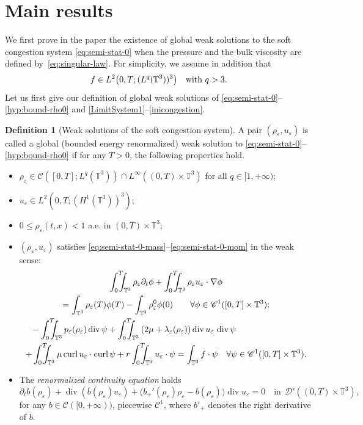 \documentclass[10pt]{amsart}
\let\mathcal\mathscr
\let\cal\mathcal
\newcommand{\<}{\bigl\langle}
\renewcommand{\>}{\bigr\rangle}
\newcommand{\intTTT}{\int_0^T\hspace*{-2.5mm}\int_{\TT}}
\newcommand{\labeleq}[1]{}
\theoremstyle{definition}
\newtheorem{definition}[thm]{Definition}
\theoremstyle{remark}
\newcommand{\TT}{\mathbb{T}^3}
\DeclareMathOperator{\curl}{curl}
\DeclareMathOperator{\Div}{div}
\let\ep\varepsilon
\begin{document}
\section{Main results}
We first prove in the paper the existence of global weak solutions to the soft congestion system \eqref{eq:semi-stat-0} when the pressure and the bulk viscosity are defined by~\eqref{eq:singular-law}. For simplicity, we assume in addition that
\begin{equation}\label{hyp:f}
f \in L^2\big(0,T; (L^q(\TT))^3\big) \quad\hbox{with } q>3.
\end{equation}
Let us first give our definition of global weak solutions of \eqref{eq:semi-stat-0}--\eqref{hyp:bound-rho0} and \eqref{LimitSystem1}--\eqref{inicongestion}.
\begin{definition}[Weak solutions of the soft congestion system]
A pair $(\rho_\ep,u_\ep)$ is called a global (bounded energy renormalized) weak solution to \eqref{eq:semi-stat-0}--\eqref{hyp:bound-rho0} if for any $T > 0$, the following properties hold.
\begin{itemize}
\item $\rho_\ep \in \mathcal{C}([0,T];L^q(\TT)) \cap L^\infty((0,T) \times \TT)$ for all $q \in [1, +\infty)$;
\item
$u_\ep\in L^2(0,T;(H^1(\TT))^3)$;
\item $0 \leq \rho_\ep(t,x) < 1$ a.e. in $(0,T)\times \TT$;
\item $(\rho_\ep,u_\ep)$ satisfies \eqref{eq:semi-stat-0-mass}--\eqref{eq:semi-stat-0-mom}
in the weak sense:
\begin{multline*}\labeleq{weak-ep-mass}
\intTTT{\rho_{\ep} \partial_t \phi}
+ \intTTT{\rho_{\ep} u_{\ep} \cdot \nabla \phi} \\
= \int_{\TT}{\rho_\ep(T) \phi(T)} - \int_{\TT}{\rho_\ep^0 \phi(0)}
\qquad \forall \phi \in \mathcal{C}^1([0,T] \times \TT);
\\
\labeleq{weak-ep-div-mom}
\shoveleft{- \intTTT{p_{\ep}(\rho_{\ep})\Div \psi}
+ \intTTT{(2\mu+\lambda_{\ep}(\rho_{\ep}))
\Div u_{\ep} \, \Div \psi}} \\
+ \intTTT
\mu\curl u_{\ep} \cdot \curl \psi
+ r\intTTT{u_{\ep} \cdot \psi}
= \int_{\TT}{f \cdot \psi}
\quad \forall \psi \in \mathcal{C}^1([0,T] \times \TT).
\end{multline*} 
\item The \emph{renormalized continuity equation} holds
\begin{equation*}\labeleq{renormalized-ep}
\partial_t b(\rho_{\ep}) + \Div(b(\rho_{\ep}) u_{\ep})
+ \big(b_+'(\rho_{\ep})\rho_{\ep}
- b(\rho_{\ep})\big)\Div u_{\ep} = 0
\quad \text{in}~~\mathcal{D}'((0,T)\times \TT),
\end{equation*}
for any $b\in \mathcal{C}([0,+\infty))$, piecewise ${\cal C}^1$, where $b'_+$
denotes the right derivative of $b$.


\end{itemize}
\end{definition}
\end{document}
